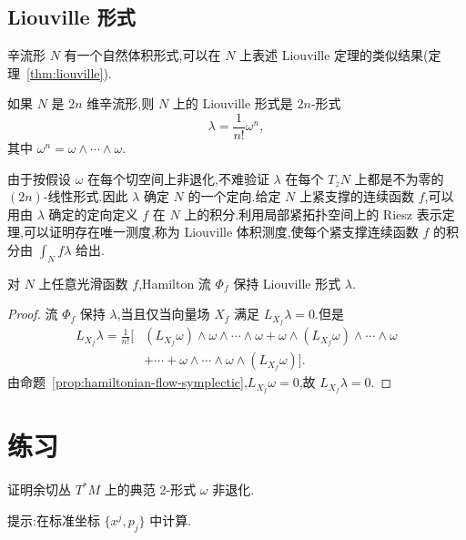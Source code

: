 \subsection{Liouville 形式}
\label{subsec:liouville-form}

辛流形 $N$ 有一个自然体积形式,可以在 $N$ 上表述 Liouville 定理的类似结果(定理~\ref{thm:liouville}).

\begin{definition}[Liouville 形式]\label{def:liouville-form}
如果 $N$ 是 $2n$ 维辛流形,则 $N$ 上的 Liouville 形式是 $2n$-形式
\[
 \lambda=\frac1{n!}\omega^n,
\]
其中 $\omega^n=\omega\wedge\cdots\wedge\omega$.
\end{definition}

由于按假设 $\omega$ 在每个切空间上非退化,不难验证 $\lambda$ 在每个 $T_zN$ 上都是不为零的 $(2n)$-线性形式.因此 $\lambda$ 确定 $N$ 的一个定向.给定 $N$ 上紧支撑的连续函数 $f$,可以用由 $\lambda$ 确定的定向定义 $f$ 在 $N$ 上的积分.利用局部紧拓扑空间上的 Riesz 表示定理,可以证明存在唯一测度,称为 Liouville 体积测度,使每个紧支撑连续函数 $f$ 的积分由 $\int_Nf\lambda$ 给出.

\begin{theorem}[Liouville 定理]\label{thm:liouville-manifold}
对 $N$ 上任意光滑函数 $f$,Hamilton 流 $\Phi_f$ 保持 Liouville 形式 $\lambda$.
\end{theorem}

\begin{proof}
流 $\Phi_f$ 保持 $\lambda$,当且仅当向量场 $X_f$ 满足 $L_{X_f}\lambda=0$.但是
\[
\begin{aligned}
 L_{X_f}\lambda
 =\frac1{n!}\bigl[&(L_{X_f}\omega)\wedge\omega\wedge\cdots\wedge\omega
 +\omega\wedge(L_{X_f}\omega)\wedge\cdots\wedge\omega\\
 &+\cdots+\omega\wedge\cdots\wedge\omega\wedge(L_{X_f}\omega)\bigr].
\end{aligned}
\]
由命题~\ref{prop:hamiltonian-flow-symplectic},$L_{X_f}\omega=0$,故 $L_{X_f}\lambda=0$.
\end{proof}

\section{练习}
\label{sec:chapter21-exercises}

\begin{exercise}[典范 2-形式的非退化性]\label{ex:canonical-two-form-nondegenerate}
证明余切丛 $T^*M$ 上的典范 2-形式 $\omega$ 非退化.

提示:在标准坐标 $\{x^j,p_j\}$ 中计算.
\end{exercise}

